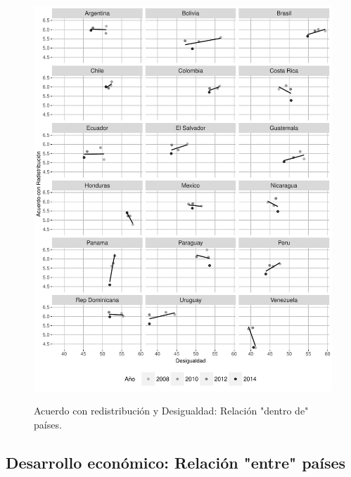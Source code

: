 \documentclass[12pt,letterpaper]{article}
\begin{document}
\begin{center}
	\begin{figure}[H]
		\caption[Acuerdo con redistribución y Desigualdad: Relación "dentro de" países.]{Acuerdo con redistribución y Desigualdad: Relación "dentro de" países.}
		\includegraphics[width=1\textwidth]{G4c.pdf}
		\label{fig:g6}
	\end{figure}
\end{center}

\newpage


\subsection{Desarrollo económico: Relación "entre" países \label{sec:sec64}}
\end{document}
